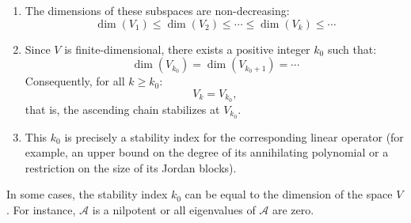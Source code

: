 \documentclass[11pt]{../../TexTemplate/elegantbook} %
\begin{document}
\begin{property}
    \begin{enumerate}
        \item The dimensions of these subspaces are non-decreasing:
            \[
            \dim(V_{1}) \leq \dim(V_{2}) \leq \cdots \leq \dim(V_{k}) \leq \cdots
            \]
        \item Since \(V\) is finite-dimensional, there exists a positive integer \( k_0 \) such that:
            \[
            \dim(V_{k_0}) = \dim(V_{k_0 + 1}) = \cdots
            \]
            Consequently, for all \( k \geq k_0 \):
            \[
            V_{k} = V_{k_0},
            \]
            that is, the ascending chain stabilizes at \( V_{k_0} \).
        \item This \( k_0 \) is precisely a stability index for the corresponding linear operator 
            (for example, an upper bound on the degree of its annihilating polynomial or
            a restriction on the size of its Jordan blocks).
    \end{enumerate}
\end{property}
\begin{remark}
    In some cases, the stability index \( k_0 \) can be equal to the dimension of the space \( V \).
    For instance, \( \mathcal{A} \) is a nilpotent or all eigenvalues of \( \mathcal{A} \) are zero.
\end{remark}
\end{document}
